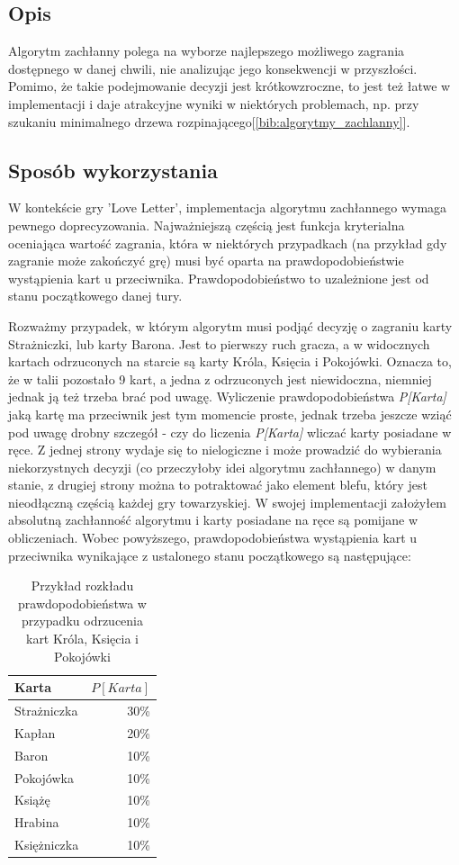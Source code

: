 \subsection{Opis}
Algorytm zachłanny polega na wyborze najlepszego możliwego zagrania dostępnego w danej chwili, nie analizując jego konsekwencji w przyszłości. Pomimo, że takie podejmowanie decyzji jest krótkowzroczne, to jest też łatwe w implementacji i daje atrakcyjne wyniki w niektórych problemach, np. przy szukaniu minimalnego drzewa rozpinającego[\ref{bib:algorytmy_zachlanny}].

\subsection{Sposób wykorzystania}

W kontekście gry 'Love Letter', implementacja algorytmu zachłannego wymaga pewnego doprecyzowania. Najważniejszą częścią jest funkcja kryterialna oceniająca wartość zagrania, która w niektórych przypadkach (na przykład gdy zagranie może zakończyć grę) musi być oparta na prawdopodobieństwie wystąpienia kart u przeciwnika. Prawdopodobieństwo to uzależnione jest od stanu początkowego danej tury.

Rozważmy przypadek, w którym algorytm musi podjąć decyzję o zagraniu karty Strażniczki, lub karty Barona. Jest to pierwszy ruch gracza, a w widocznych kartach odrzuconych na starcie są karty Króla, Księcia i Pokojówki. Oznacza to, że w talii pozostało 9 kart, a jedna z odrzuconych jest niewidoczna, niemniej jednak ją też trzeba brać pod uwagę. Wyliczenie prawdopodobieństwa \textit{P[Karta]} jaką kartę ma przeciwnik jest tym momencie proste, jednak trzeba jeszcze wziąć pod uwagę drobny szczegół - czy do liczenia \textit{P[Karta]} wliczać karty posiadane w ręce. Z jednej strony wydaje się to nielogiczne i może prowadzić do wybierania niekorzystnych decyzji (co przeczyłoby idei algorytmu zachłannego) w danym stanie, z drugiej strony można to potraktować jako element blefu, który jest nieodłączną częścią każdej gry towarzyskiej. W swojej implementacji założyłem absolutną zachłanność algorytmu i karty posiadane na ręce są pomijane w obliczeniach. 
Wobec powyższego, prawdopodobieństwa wystąpienia kart u przeciwnika wynikające z ustalonego stanu początkowego są następujące:

\begin{table}[h]
	\caption{Przykład rozkładu prawdopodobieństwa w przypadku odrzucenia kart Króla, Księcia i Pokojówki}
	\centering
		\begin{tabular}{|l|r|}
			\hline
			\bf{Karta} & $P[Karta]$	\\ \hline
			Strażniczka & 30\% 			\\ \hline
			Kapłan & 20\% 				\\ \hline
			Baron & 10\% 				\\ \hline
			Pokojówka & 10\% 			\\ \hline
			Książę & 10\% 				\\ \hline
			Hrabina & 10\% 				\\ \hline
			Księżniczka & 10\% 			\\ \hline
		\end{tabular}
\end{table}

